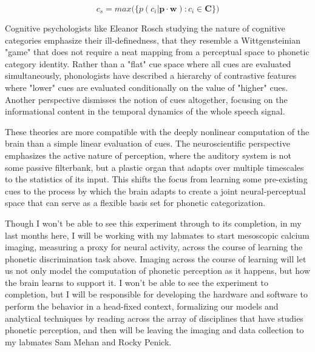 \begin{equation}
\label{eqn:infer_2}
c_s = max\big( \big\{ p(c_i | \mathbf{p} \cdot \mathbf{w}) : c_i \in \mathbf{C} \big\}\big)
\end{equation}

Cognitive psychologists like Eleanor Rosch studying the nature of cognitive categories emphasize their ill-definedness, that they resemble a Wittgensteinian "game" that does not require a neat mapping from a perceptual space to phonetic category identity\cite{roschWittgensteinCategorizationResearch1987, roschFamilyResemblancesStudies1975}. Rather than a "flat" cue space where all cues are evaluated simultaneously, phonologists have described a hierarchy of contrastive features where "lower" cues are evaluated conditionally on the value of "higher" cues\cite{Dresher2008}. Another perspective dismisses the notion of cues altogether, focusing on the informational content in the temporal dynamics of the whole speech signal\cite{kluenderLongstandingProblemsSpeech2019}.

These theories are more compatible with the deeply nonlinear computation of the brain than a simple linear evaluation of cues. The neuroscientific perspective emphasizes the active nature of perception, where the auditory system is not some passive filterbank, but a plastic organ that adapts over multiple timescales to the statistics of its input\cite{angeloniContextualModulationSound2018, holtTemporallyNonadjacentNonlinguistic2005}. This shifts the focus from learning some pre-existing cues to the process by which the brain adapts to create a joint neural-perceptual space that can serve as a flexible basis set for phonetic categorization. 

\begin{todo}
Though I won't be able to see this experiment through to its completion, in my last months here, I will be working with my labmates to start mesoscopic calcium imaging, measuring a proxy for neural activity, across the course of learning the phonetic discrimination task above. Imaging across the course of learning will let us not only model the computation of phonetic perception as it happens, but how the brain learns to support it. I won't be able to see the experiment to completion, but I will be responsible for developing the hardware and software to perform the behavior in a head-fixed context, formalizing our models and analytical techniques by reading across the array of disciplines that have studies phonetic perception, and then will be leaving the imaging and data collection to my labmates Sam Mehan and Rocky Penick.
\end{todo}
